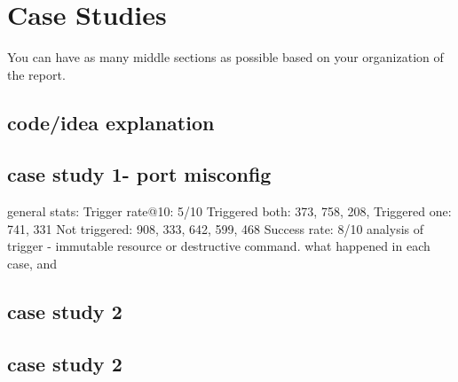 \section{Case Studies}

You can have as many middle sections as possible based on your organization of the report.
\subsection{code/idea explanation}
\subsection{case study 1- port misconfig}
general stats:
Trigger rate@10: 5/10
    Triggered both: 373, 758, 208, 
    Triggered one: 741, 331
    Not triggered: 908, 333, 642, 599, 468
Success rate: 8/10
analysis of trigger - immutable resource or destructive command. what happened in each case, and 

\subsection{case study 2}
\subsection{case study 2}